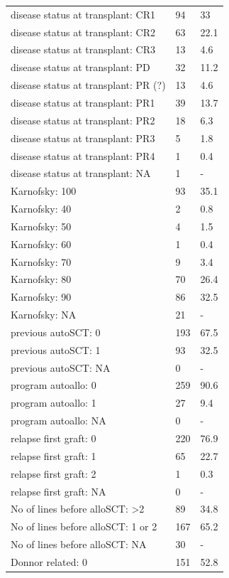 \documentclass[a4paper,11pt] {article}
\begin{document}
\begin{longtable}{lll}
  disease status at transplant: CR1 & 94 & 33 \\ 
  disease status at transplant: CR2 & 63 & 22.1 \\ 
  disease status at transplant: CR3 & 13 & 4.6 \\ 
  disease status at transplant: PD & 32 & 11.2 \\ 
  disease status at transplant: PR (?) & 13 & 4.6 \\ 
  disease status at transplant: PR1 & 39 & 13.7 \\ 
  disease status at transplant: PR2 & 18 & 6.3 \\ 
  disease status at transplant: PR3 & 5 & 1.8 \\ 
  disease status at transplant: PR4 & 1 & 0.4 \\ 
  disease status at transplant: NA & 1 & - \\ 
  Karnofsky: 100 & 93 & 35.1 \\ 
  Karnofsky: 40 & 2 & 0.8 \\ 
  Karnofsky: 50 & 4 & 1.5 \\ 
  Karnofsky: 60 & 1 & 0.4 \\ 
  Karnofsky: 70 & 9 & 3.4 \\ 
  Karnofsky: 80 & 70 & 26.4 \\ 
  Karnofsky: 90 & 86 & 32.5 \\ 
  Karnofsky: NA & 21 & - \\ 
  previous autoSCT: 0 & 193 & 67.5 \\ 
  previous autoSCT: 1 & 93 & 32.5 \\ 
  previous autoSCT: NA & 0 & - \\ 
  program autoallo: 0 & 259 & 90.6 \\ 
  program autoallo: 1 & 27 & 9.4 \\ 
  program autoallo: NA & 0 & - \\ 
  relapse first graft: 0 & 220 & 76.9 \\ 
  relapse first graft: 1 & 65 & 22.7 \\ 
  relapse first graft: 2 & 1 & 0.3 \\ 
  relapse first graft: NA & 0 & - \\ 
  No of lines before alloSCT: >2 & 89 & 34.8 \\ 
  No of lines before alloSCT: 1 or 2 & 167 & 65.2 \\ 
  No of lines before alloSCT: NA & 30 & - \\ 
  Donnor related: 0 & 151 & 52.8 \\ 

\end{longtable}
\end{document}
